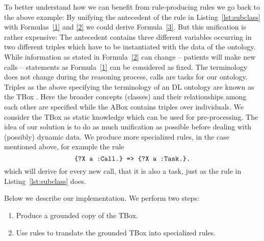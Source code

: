 To better understand how we can benefit from rule-producing rules we go back to the above example: 
By unifying the antecedent of the rule in Listing~\ref{lst:subclass} with Formulas~\ref{1} and \ref{2} we could derive Formula~\ref{3}.
But this unification is rather expensive: The antecedent contains three different variables occurring 
in two different triples which have to be instantiated with the data of the ontology. %
While information as stated in 
Formula~\ref{2} can change -- patients will make new calls -- statements as Formula~\ref{1} can be considered as fixed.
The terminology does not change during the reasoning process,
calls are tasks for our ontology. %
Triples as the above specifying the terminology of an DL ontology are known as the TBox \cite[ch. 1]{dl}. 
Here the broader concepts (classes) and their relationships among each other are specified  
while the ABox contains triples over individuals.
We consider the
TBox as static knowledge which can be used for pre-processing. The idea of our solution is to do as much unification as possible before dealing with (possibly) dynamic data. 
We produce more specialized rules, in the case mentioned above, for example the rule
%
\begin{equation} 
\verb!{?X a :Call.} => {?X a :Task.}.!
\label{4}
\end{equation}
which will derive for every new call, that it is also a task, just as the rule in Listing~\ref{lst:subclass} does.

Below we describe our implementation.
We perform two steps:
\begin{enumerate}
 \item Produce a grounded copy of the  TBox. 
 \item Use rules to translate the grounded TBox into specialized rules.
\end{enumerate}

